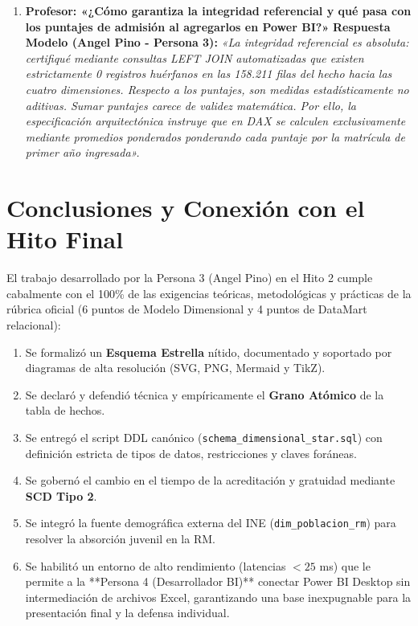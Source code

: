 \documentclass[11pt,a4paper]{article}
\begin{document}
\begin{enumerate}[leftmargin=*]
    \item \textbf{Profesor: «¿Cómo garantiza la integridad referencial y qué pasa con los puntajes de admisión al agregarlos en Power BI?»}
    \newline \textbf{Respuesta Modelo (Angel Pino - Persona 3):}
    \textit{«La integridad referencial es absoluta: certifiqué mediante consultas LEFT JOIN automatizadas que existen estrictamente 0 registros huérfanos en las 158.211 filas del hecho hacia las cuatro dimensiones. Respecto a los puntajes, son medidas estadísticamente no aditivas. Sumar puntajes carece de validez matemática. Por ello, la especificación arquitectónica instruye que en DAX se calculen exclusivamente mediante promedios ponderados ponderando cada puntaje por la matrícula de primer año ingresada».}
\end{enumerate}

\section{Conclusiones y Conexión con el Hito Final}
\label{sec:conclusiones}

El trabajo desarrollado por la Persona 3 (Angel Pino) en el Hito 2 cumple cabalmente con el 100\% de las exigencias teóricas, metodológicas y prácticas de la rúbrica oficial (6 puntos de Modelo Dimensional y 4 puntos de DataMart relacional):

\begin{enumerate}[leftmargin=*]
    \item Se formalizó un \textbf{Esquema Estrella} nítido, documentado y soportado por diagramas de alta resolución (SVG, PNG, Mermaid y TikZ).
    \item Se declaró y defendió técnica y empíricamente el \textbf{Grano Atómico} de la tabla de hechos.
    \item Se entregó el script DDL canónico (\texttt{schema\_dimensional\_star.sql}) con definición estricta de tipos de datos, restricciones y claves foráneas.
    \item Se gobernó el cambio en el tiempo de la acreditación y gratuidad mediante \textbf{SCD Tipo 2}.
    \item Se integró la fuente demográfica externa del INE (\texttt{dim\_poblacion\_rm}) para resolver la absorción juvenil en la RM.
    \item Se habilitó un entorno de alto rendimiento (latencias $<25$ ms) que le permite a la **Persona 4 (Desarrollador BI)** conectar Power BI Desktop sin intermediación de archivos Excel, garantizando una base inexpugnable para la presentación final y la defensa individual.
\end{enumerate}
\end{document}
